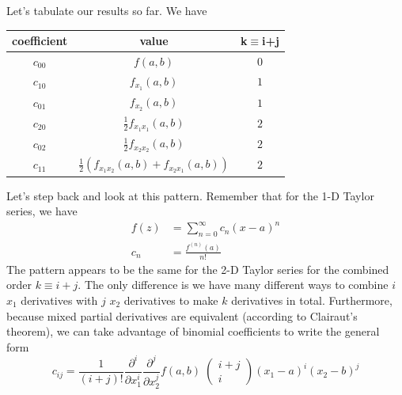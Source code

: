 \documentclass{article}
\begin{document}
Let's tabulate our results so far. We have
\begin{center}
 \begin{tabular}{||c c c ||} 
   \hline
   coefficient & value & k$\equiv$i+j \\ 
   \hline\hline
   $c_{00}$ & $f(a,b)$ & $0$ \\ 
   \hline
   $c_{10}$ & $f_{x_1}(a,b)$ & $1$ \\
   \hline
   $c_{01}$ & $f_{x_2}(a,b)$ & $1$ \\
   $c_{20}$ & $\frac{1}{2}f_{x_1 x_1}(a,b)$ & $2$ \\
   $c_{02}$ & $\frac{1}{2}f_{x_2 x_2}(a,b)$ & $2$ \\
   $c_{11}$ & $\frac{1}{2}\left(f_{x_1 x_2}(a,b) + f_{x_2 x_1}(a,b)\right)$ & $2$ 
\end{tabular}
\end{center}
Let's step back and look at this pattern. Remember that for the 1-D Taylor
series, we have
\begin{align}
  f(z) &= \sum_{n=0}^\infty c_n(x-a)^n \\
  c_n &= \frac{f^{(n)}(a)}{n!}
\end{align}
The pattern appears to be the same for the 2-D Taylor series for the combined
order $k \equiv i + j$. The only difference is we have many different ways to
combine $i$ $x_1$ derivatives with $j$ $x_2$ derivatives to make $k$ derivatives
in total. Furthermore, because mixed partial derivatives are equivalent
(according to Clairaut's theorem), we can take advantage of binomial
coefficients to write the general form
\begin{equation}
  c_{ij} = \frac{1}{(i+j)!}\frac{\partial^i}{\partial x_1^i}\frac{\partial^j}{\partial x_2^j}f(a,b)\;\begin{pmatrix}i+j\\ i\end{pmatrix}(x_1-a)^i(x_2-b)^j
\end{equation}
\end{document}
